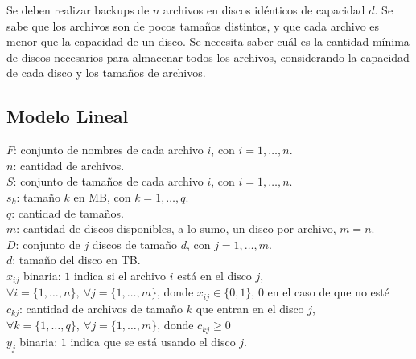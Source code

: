 \documentclass[11pt, a4paper, pdftex]{article}
\begin{document}
Se deben realizar backups de $n$ archivos en discos idénticos de
capacidad $d$.  Se sabe que los archivos son de pocos tamaños distintos,
y que cada archivo es menor que la capacidad de un disco. Se necesita
saber cuál es la cantidad mínima de discos necesarios para almacenar
todos los archivos, considerando la capacidad de cada disco y los
tamaños de archivos.

\subsection{Modelo Lineal}



$F$: conjunto de nombres de cada archivo $i$, con $i = 1, \ldots, n$. \\

$n$: cantidad de archivos. \\

$S$: conjunto de tamaños de cada archivo $i$, con $i = 1, \ldots, n$. \\

$s_{k}$: tamaño $k$ en MB, con $k = 1, \ldots, q$. \\

$q$: cantidad de tamaños. \\

$m$: cantidad de discos disponibles, a lo sumo, un disco por archivo, $m = n$. \\

$D$: conjunto de $j$ discos de tamaño $d$, con $j = 1, \ldots, m$. \\

$d$: tamaño del disco en TB. \\ 

$x_{ij}$ binaria: $1$ indica si el archivo $i$ está en el disco $j$, $\forall i = \{1, \ldots, n\},\ \forall j = \{1, \ldots, m\}$, donde $x_{ij} \in \{0, 1\}$, $0$ en el caso de que no esté\\

$c_{kj}$: cantidad de archivos de tamaño $k$ que entran en el disco $j$, $\forall k = \{1, \ldots, q\},\ \forall j = \{1, \ldots, m\}$, donde $c_{kj} \ge 0$\\

$y_{j}$ binaria: $1$ indica que se está usando el disco $j$.
\end{document}
